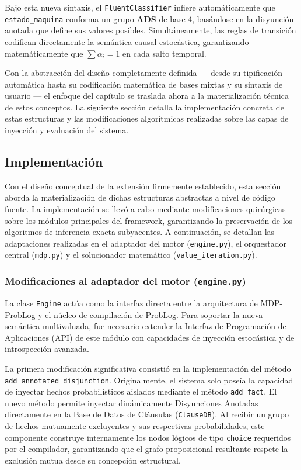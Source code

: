 Bajo esta nueva sintaxis, el \texttt{FluentClassifier} infiere automáticamente que \texttt{estado\_maquina} conforma un grupo \textbf{ADS} de base 4, basándose en la disyunción anotada que define sus valores posibles. Simultáneamente, las reglas de transición codifican directamente la semántica causal estocástica, garantizando matemáticamente que $\sum \alpha_i = 1$ en cada salto temporal.

Con la abstracción del diseño completamente definida --- desde su tipificación automática hasta su codificación matemática de bases mixtas y su sintaxis de usuario --- el enfoque del capítulo se traslada ahora a la materialización técnica de estos conceptos. La siguiente sección detalla la implementación concreta de estas estructuras y las modificaciones algorítmicas realizadas sobre las capas de inyección y evaluación del sistema.

\subsection{Implementación}
\label{sec:di-implementacion}

Con el diseño conceptual de la extensión firmemente establecido, esta sección aborda la materialización de dichas estructuras abstractas a nivel de código fuente. La implementación se llevó a cabo mediante modificaciones quirúrgicas sobre los módulos principales del framework, garantizando la preservación de los algoritmos de inferencia exacta subyacentes. A continuación, se detallan las adaptaciones realizadas en el adaptador del motor (\texttt{engine.py}), el orquestador central (\texttt{mdp.py}) y el solucionador matemático (\texttt{value\_iteration.py}).

\subsubsection{Modificaciones al adaptador del motor (\texttt{engine.py})}
\label{sec:di-engine}

La clase \texttt{Engine} actúa como la interfaz directa entre la arquitectura de MDP-ProbLog y el núcleo de compilación de ProbLog. Para soportar la nueva semántica multivaluada, fue necesario extender la Interfaz de Programación de Aplicaciones (API) de este módulo con capacidades de inyección estocástica y de introspección avanzada.

La primera modificación significativa consistió en la implementación del método \texttt{add\_annotated\_disjunction}. Originalmente, el sistema solo poseía la capacidad de inyectar hechos probabilísticos aislados mediante el método \texttt{add\_fact}. El nuevo método permite inyectar dinámicamente Disyunciones Anotadas directamente en la Base de Datos de Cláusulas (\texttt{ClauseDB}). Al recibir un grupo de hechos mutuamente excluyentes y sus respectivas probabilidades, este componente construye internamente los nodos lógicos de tipo \texttt{choice} requeridos por el compilador, garantizando que el grafo proposicional resultante respete la exclusión mutua desde su concepción estructural.

